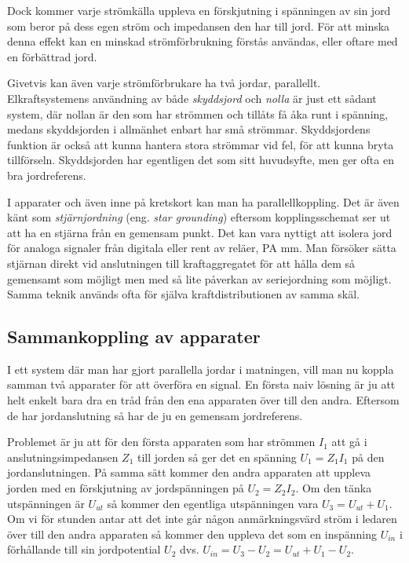 Dock kommer varje strömkälla uppleva en förskjutning i spänningen av
sin jord som beror på dess egen ström och impedansen den har till jord. För att
minska denna effekt kan en minskad strömförbrukning förstås användas, eller
oftare med en förbättrad jord.

Givetvis kan även varje strömförbrukare ha två jordar, parallellt.
Elkraftsystemens användning av både \emph{skyddsjord} och \emph{nolla} är
just ett sådant system, där nollan är den som har strömmen och tillåts få
åka runt i spänning, medans skyddsjorden i allmänhet enbart har små strömmar.
Skyddsjordens funktion är också att kunna hantera stora strömmar vid fel,
för att kunna bryta tillförseln. Skyddsjorden har egentligen det som
sitt huvudsyfte, men ger ofta en bra jordreferens.

I apparater och även inne på kretskort kan man ha parallellkoppling. Det är även
känt som \emph{stjärnjordning} (eng. \emph{star grounding}) eftersom
kopplingsschemat ser ut att ha en stjärna från en gemensam punkt. Det kan vara
nyttigt att isolera jord för analoga signaler från digitala eller rent av
reläer, PA mm. Man försöker sätta stjärnan direkt vid anslutningen till
kraftaggregatet för att hålla dem så gemensamt som möjligt men med så lite
påverkan av seriejordning som möjligt. Samma teknik används ofta för själva
kraftdistributionen av samma skäl.

\subsection{Sammankoppling av apparater}
\label{sammankopplingavapparater}

I ett system där man har gjort parallella jordar i matningen,
vill man nu koppla samman två apparater för att överföra en signal.
En första naiv lösning är ju att helt enkelt bara dra en tråd från den ena
apparaten över till den andra. Eftersom de har jordanslutning så har de ju en
gemensam jordreferens.

Problemet är ju att för den första apparaten som har strömmen \(I_1\) att gå i
anslutningsimpedansen \(Z_1\) till jorden så ger det en spänning
\(U_1 = Z_1 I_1\) på den jordanslutningen. På samma sätt kommer den
andra apparaten att uppleva jorden med en förskjutning av jordspänningen på
\(U_2 = Z_2 I_2\). Om den tänka utspänningen är \(U_{ut}\) så kommer den
egentliga utspänningen vara \(U_3 = U_{ut} + U_1\). Om vi för stunden antar att
det inte går någon anmärkningsvärd ström i ledaren över till den andra
apparaten så kommer den uppleva det som en inspänning \(U_{in}\) i förhållande
till sin jordpotential \(U_2\) dvs. \(U_{in} = U_3 - U_2 = U_{ut} + U_1 - U_2\).

